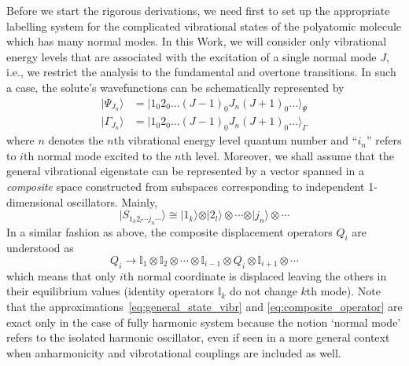 \documentclass[b5paper,oneside,fleqn,11pt]{book}
\begin{document}
\begin{refsection}
Before we start the rigorous derivations, we need first to set up the appropriate labelling system
for the complicated vibrational states of the polyatomic molecule which has many normal modes.
In this Work, we will consider only vibrational energy levels that are associated with
the excitation of a single normal mode $J$, i.e., we restrict the analysis to the fundamental
and overtone transitions. In such a case, the 
solute's wavefunctions can be schematically represented by
%
\begin{subequations}
\begin{align}
\vert \Psi_{J_n}   \rangle &= \vert 1_0 2_0 \ldots (J-1)_0 J_n (J+1)_0 \ldots \rangle_{\Psi}   \label{eq:wfn-1-solvated} \\ 
\vert \Gamma_{J_n} \rangle &= \vert 1_0 2_0 \ldots (J-1)_0 J_n (J+1)_0 \ldots \rangle_{\Gamma} \label{eq:wfn-2-gas-phase}
\end{align}
\end{subequations}
%
where $n$ denotes the $n$th vibrational energy level quantum number
and ``$i_n$'' refers to $i$th normal mode excited to the $n$th level.
Moreover, we shall assume that the general vibrational 
eigenstate can be represented by a vector spanned
in a \emph{composite} space constructed from subspaces corresponding 
to independent 1\hyp{}dimensional oscillators. Mainly,
%
\begin{equation}  \label{eq:general_state_vibr}
\vert S_{1_k2_l\cdots j_n\cdots}   \rangle 
 \cong 
 \vert 1_k \rangle \otimes 
 \vert 2_l \rangle \otimes \cdots \otimes
 \vert j_n \rangle \otimes \cdots 
\end{equation}
%
In a similar fashion as above, the composite displacement operators $Q_i$
are understood as
%
\begin{equation} \label{eq:composite_operator}
Q_i \rightarrow \mathbb{I}_1 \otimes \mathbb{I}_2 \otimes \cdots \otimes 
 \mathbb{I}_{i-1} \otimes Q_i \otimes \mathbb{I}_{i+1} \otimes \cdots
\end{equation}
%
which means that only $i$th normal coordinate is displaced leaving the others
in their equilibrium values (identity operators $\mathbb{I}_k$ do not change $k$th mode).
%
Note that the approximations~\eqref{eq:general_state_vibr} and \eqref{eq:composite_operator} 
are exact only in the case of 
fully harmonic system because the notion `normal mode' refers to
the isolated harmonic oscillator, even if seen in a more general context
when anharmonicity and vibrotational couplings are included as well.


\end{refsection}
\end{document}
